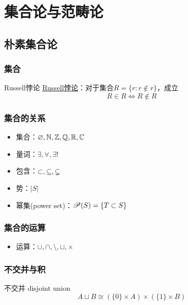 % 

% 
	
\chapter{集合论与范畴论}

\section{朴素集合论}

\subsection{集合}

\begin{theorem}{Russell悖论}
	\href{https://en.wikipedia.org/wiki/Russell%27s_paradox}{Russell悖论}：对于集合$R=\{r:r\notin r\}$，成立
	$$
	R\in R\iff R\notin R
	$$
\end{theorem}

\subsection{集合的关系}

\begin{itemize}
	\item 集合：$\varnothing,\mathbb{N},\mathbb{Z},\mathbb{Q},\mathbb{R},\mathbb{C}$
	\item 量词：$\exists,\forall,\exists!$
	\item 包含：$\subset,\subseteq,\subsetneq$
	\item 势：$|S|$
	\item 幂集(power set)：$\mathscr{P}(S)=\{T\subset S\}$
\end{itemize}

\subsection{集合的运算}

\begin{itemize}
	\item 运算：$\cup,\cap,\setminus,\sqcup,\times$
\end{itemize}

\subsection{不交并与积}

\begin{definition}{不交并 disjoint union}
	$$
	A\sqcup B\cong (\{0\}\times A)\times(\{1\}\times B)
	$$
\end{definition}

